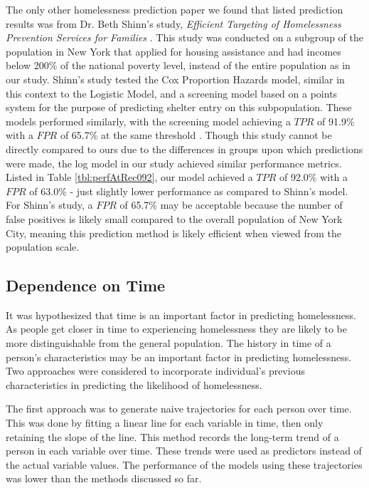 \documentclass[utf8]{frontiersFPHY} %
\begin{document}
The only other homelessness prediction paper we found that listed prediction results was from Dr. Beth Shinn's study, \textit{Efficient Targeting of Homelessness Prevention Services for Families} \cite{shinn2013efficient}. This study was conducted on a subgroup of the population in New York that applied for housing assistance and had incomes below 200\% of the national poverty level, instead of the entire population as in our study. Shinn's study tested the Cox Proportion Hazards model, similar in this context to the Logistic Model, and a screening model based on a points system for the purpose of predicting shelter entry on this subpopulation. These models performed similarly, with the screening model achieving a $TPR$ of 91.9\% with a $FPR$ of 65.7\% at the same threshold \cite{shinn2013efficient}. Though this study cannot be directly compared to ours due to the differences in groups upon which predictions were made, the log model in our study achieved similar performance metrics. Listed in Table \ref{tbl:perfAtRec092}, our model achieved a $TPR$ of 92.0\% with a $FPR$ of 63.0\% - just slightly lower performance as compared to Shinn's model. For Shinn's study, a $FPR$ of 65.7\% may be acceptable because the number of false positives is likely small compared to the overall population of New York City, meaning this prediction method is likely efficient when viewed from the population scale. 

\subsection{Dependence on Time}
It was hypothesized that time is an important factor in predicting homelessness. As people get closer in time to experiencing homelessness they are likely to be more distinguishable from the general population. The history in time of a person's characteristics may be an important factor in predicting homelessness. Two approaches were considered to incorporate individual's previous characteristics in predicting the likelihood of homelessness.

The first approach was to generate naive trajectories for each person over time. This was done by fitting a linear line for each variable in time, then only retaining the slope of the line. This method records the long-term trend of a person in each variable over time. These trends were used as predictors instead of the actual variable values. The performance of the models using these trajectories was lower than the methods discussed so far.
\end{document}
